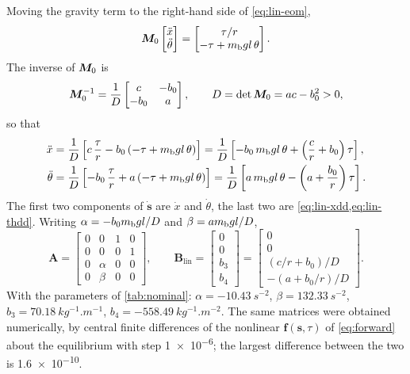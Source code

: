 Moving the gravity term to the right-hand side of \cref{eq:lin-eom},
\begin{equation}
  \bm{M}_0 \begin{bmatrix} \ddot x \\ \ddot\theta \end{bmatrix}
  = \begin{bmatrix} \tau/r \\ -\tau + m_{\mathrm b} g l\,\theta \end{bmatrix} .
\end{equation}
The inverse of $\bm{M}_0$ is
\begin{equation}
  \bm{M}_0^{-1} = \frac{1}{D}\begin{bmatrix} c & -b_0 \\ -b_0 & a \end{bmatrix},
  \qquad D = \det\bm{M}_0 = ac - b_0^2 > 0 ,
\end{equation}
so that
\begin{align}
  \ddot x &= \frac{1}{D}\left[c\,\frac{\tau}{r} - b_0\left(-\tau + m_{\mathrm b} g l\,\theta\right)\right]
           = \frac{1}{D}\left[-b_0\,m_{\mathrm b} g l\,\theta + \left(\frac{c}{r} + b_0\right)\tau\right],
  \label{eq:lin-xdd}\\
  \ddot\theta &= \frac{1}{D}\left[-b_0\,\frac{\tau}{r} + a\left(-\tau + m_{\mathrm b} g l\,\theta\right)\right]
           = \frac{1}{D}\left[a\,m_{\mathrm b} g l\,\theta - \left(a + \frac{b_0}{r}\right)\tau\right].
  \label{eq:lin-thdd}
\end{align}
The first two components of $\dot{\bm s}$ are $\dot x$ and $\dot\theta$, the
last two are \cref{eq:lin-xdd,eq:lin-thdd}. Writing $\alpha = -b_0m_{\mathrm b} g l/D$
and $\beta = am_{\mathrm b} g l/D$,
\begin{equation}
  \bm A = \begin{bmatrix}
    0 & 0 & 1 & 0 \\
    0 & 0 & 0 & 1 \\
    0 & \alpha & 0 & 0 \\
    0 & \beta & 0 & 0
  \end{bmatrix},
  \qquad
  \bm B_{\mathrm{lin}} = \begin{bmatrix} 0 \\ 0 \\ b_3 \\ b_4 \end{bmatrix}
  = \begin{bmatrix} 0 \\ 0 \\ (c/r + b_0)/D \\ -(a + b_0/r)/D \end{bmatrix} .
  \label{eq:AB}
\end{equation}
With the parameters of \cref{tab:nominal}: $\alpha = \SI{-10.43}{s^{-2}}$,
$\beta = \SI{132.33}{s^{-2}}$, $b_3 = \SI{70.18}{kg^{-1}.m^{-1}}$,
$b_4 = \SI{-558.49}{kg^{-1}.m^{-2}}$. The same matrices were obtained
numerically, by central finite differences of the nonlinear $\bm f(\bm s,\tau)$
of \cref{eq:forward} about the equilibrium with step \num{1e-6}; the largest
difference between the two is \num{1.6e-10}.

